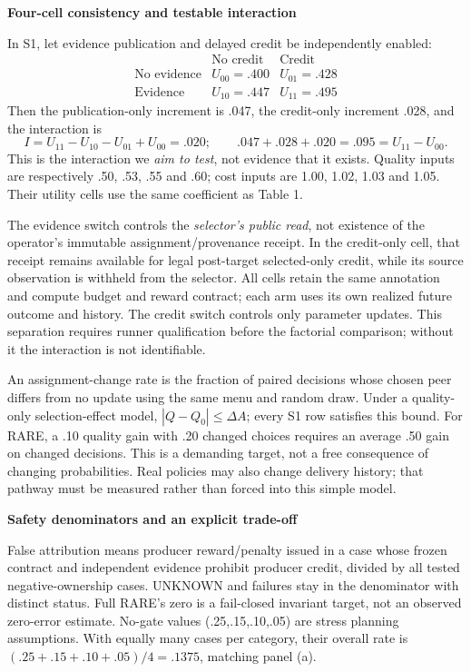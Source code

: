 \documentclass[10pt,a4paper]{article}
\newcommand{\lead}[1]{\vspace{4pt}\textbf{#1}\par}
\begin{document}
\lead{Four-cell consistency and testable interaction}
In S1, let evidence publication and delayed credit be independently enabled:
\[
\begin{array}{c|cc}
 & \text{No credit} & \text{Credit}\\\hline
\text{No evidence} & U_{00}=.400 & U_{01}=.428\\
\text{Evidence} & U_{10}=.447 & U_{11}=.495
\end{array}
\]
Then the publication-only increment is .047, the credit-only increment .028,
and the interaction is
\[
 I=U_{11}-U_{10}-U_{01}+U_{00}=.020;
 \qquad .047+.028+.020=.095=U_{11}-U_{00}.
\]
This is the interaction we \emph{aim to test}, not evidence that it exists.
Quality inputs are respectively .50, .53, .55 and .60; cost inputs are 1.00,
1.02, 1.03 and 1.05. Their utility cells use the same coefficient as Table 1.

The evidence switch controls the \emph{selector's public read}, not existence of
the operator's immutable assignment/provenance receipt. In the credit-only cell,
that receipt remains available for legal post-target selected-only credit, while
its source observation is withheld from the selector. All cells retain the same
annotation and compute budget and reward contract; each arm uses its own realized
future outcome and history. The credit switch controls only parameter updates.
This separation requires runner qualification before the factorial comparison;
without it the interaction is not identifiable.

An assignment-change rate is the fraction of paired decisions whose chosen peer
differs from no update using the same menu and random draw. Under a quality-only
selection-effect model, $|Q-Q_0|\leq\Delta A$; every S1 row satisfies this bound.
For RARE, a .10 quality gain with .20 changed choices requires an average .50
gain on changed decisions. This is a demanding target, not a free consequence
of changing probabilities. Real policies may also change delivery history;
that pathway must be measured rather than forced into this simple model.

\lead{Safety denominators and an explicit trade-off}
False attribution means producer reward/penalty issued in a case whose frozen
contract and independent evidence prohibit producer credit, divided by all
tested negative-ownership cases. UNKNOWN and failures stay in the denominator
with distinct status. Full RARE's zero is a fail-closed invariant target, not
an observed zero-error estimate. No-gate values (.25,.15,.10,.05) are stress
planning assumptions. With equally many cases per category, their overall rate
is $(.25+.15+.10+.05)/4=.1375$, matching panel (a).
\end{document}
